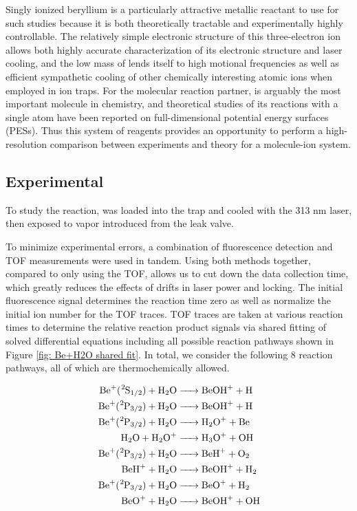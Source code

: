 Singly ionized beryllium is a particularly attractive metallic reactant to use for such studies because it is both theoretically tractable and experimentally highly controllable. The relatively simple electronic structure of this three-electron ion allows both highly accurate characterization of its electronic structure and laser cooling,\cite{Bollinger1985} and the low mass of  lends itself to high motional frequencies as well as efficient sympathetic cooling of other chemically interesting atomic ions when employed in ion traps.\cite{Chen2014a,Roth2006,Larson1986,Schowalter2016} For the molecular reaction partner,  is arguably the most important molecule in chemistry, and theoretical studies of its reactions with a single atom have been reported on full-dimensional potential energy surfaces (PESs).\cite{Li2013,Song2015,Ray2017,Li2015,Xiao2011} Thus this system of reagents provides an opportunity to perform a high-resolution comparison between experiments and theory for a molecule-ion system.

\subsection{Experimental}

To study the  reaction,  was loaded into the trap and cooled with the 313 nm laser, then exposed to  vapor introduced from the leak valve.

To minimize experimental errors, a combination of fluorescence detection and TOF measurements were used in tandem. Using both methods together, compared to only using the TOF, allows us to cut down the data collection time, which greatly reduces the effects of drifts in laser power and locking. The initial fluorescence signal determines the reaction time zero as well as normalize the initial ion number for the TOF traces. TOF traces are taken at various reaction times to determine the relative reaction product signals via shared fitting of solved differential equations including all possible reaction pathways shown in Figure \ref{fig: Be+H2O shared fit}. In total, we consider the following 8 reaction pathways, all of which are thermochemically allowed.

\begin{align}
	\ce{Be+(^2S1/2) + H2O & -> BeOH+ + H} \label{r: Be(S)+H2O->BeOH} \\
	\ce{Be+(^2P3/2) + H2O & -> BeOH+ + H} \label{r: Be(P)+H2O->BeOH} \\
	\ce{Be+(^2P3/2) + H2O & -> H2O+ + Be} \label{r: Be(P)+H2O->H2O} \\
	\ce{H2O + H2O+ & -> H3O+ + OH} \label{r: H2O+H2O->H3O} \\
	\ce{Be+(^2P3/2) + H2O & -> BeH+ + O2} \label{r: Be(P)+H2O->BeH} \\
	\ce{BeH+ + H2O & -> BeOH+ + H2} \label{r: BeH+H2O->BeOH} \\
	\ce{Be+(^2P3/2) + H2O & -> BeO+ + H2} \label{r: Be(P)+H2O->BeO} \\
	\ce{BeO+ + H2O & -> BeOH+ + OH} \label{r: BeO+H2O->BeOH}
\end{align}

